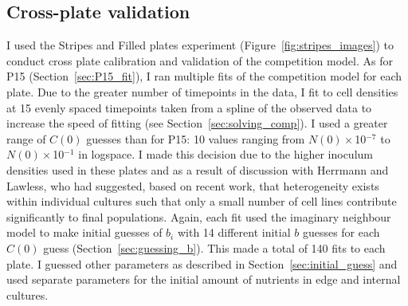 \begin{multicols}{2}

\subsection{Cross-plate validation}
\label{sec:cross_plate_val_results}

I used the Stripes and Filled plates experiment
(Figure~\ref{fig:stripes_images}) to conduct cross plate calibration
and validation of the competition model. As for P15
(Section~\ref{sec:P15_fit}), I ran multiple fits of the competition
model for each plate. Due to the greater number of timepoints in the
data, I fit to cell densities at 15 evenly spaced timepoints taken
from a spline of the observed data to increase the speed of fitting
(see Section~\ref{sec:solving_comp}). I used a greater range of
\(C(0)\) guesses than for P15: 10 values ranging from
\(N(0)\times\)10\(^{-7}\) to \(N(0)\times\)10\(^{-1}\) in logspace. I
made this decision due to the higher inoculum densities used in these
plates and as a result of discussion with Herrmann and Lawless, who
had suggested, based on recent work, that heterogeneity exists within
individual cultures such that only a small number of cell lines
contribute significantly to final populations. Again, each fit used
the imaginary neighbour model to make initial guesses of \(b_{i}\)
with 14 different initial \(b\) guesses for each \(C(0)\) guess
(Section~\ref{sec:guessing_b}). This made a total of 140 fits to each
plate. I guessed other parameters as described in
Section~\ref{sec:initial_guess} and used separate parameters for the
initial amount of nutrients in edge and internal cultures.


\end{multicols}

